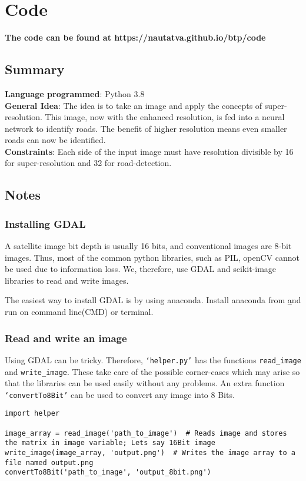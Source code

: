 \chapter{Code}\label{chapt:code}
\textbf{The code can be found at https://nautatva.github.io/btp/code}

\section{Summary}
\textbf{Language programmed}: Python 3.8 \bigskip \\
\textbf{General Idea}: The idea is to take an image and apply the concepts of super-resolution. This image, now with the enhanced resolution, is fed into a neural network to identify roads. The benefit of higher resolution means even smaller roads can now be identified. \bigskip \\
\textbf{Constraints}: Each side of the input image must have resolution divisible by 16 for super-resolution and 32 for road-detection.


\section{Notes}
\subsection{Installing GDAL}
A satellite image bit depth is usually 16 bits, and conventional images are 8-bit images. Thus, most of the common python libraries, such as PIL, openCV cannot be used due to information loss. We, therefore, use GDAL and scikit-image libraries to read and write images.

The easiest way to install GDAL is by using anaconda. Install anaconda from \href{https://www.anaconda.com/products/individual#Downloads} and run  on command line(CMD) or terminal.


\subsection{Read and write an image}
Using GDAL can be tricky. Therefore, \texttt{`helper.py'} has the functions \texttt{read\_image} and \texttt{write\_image}. These take care of the possible corner-cases which may arise so that the libraries can be used easily without any problems. An extra function \texttt{`convertTo8Bit'} can be used to convert any image into 8 Bits.

\begin{verbatim}
import helper

image_array = read_image('path_to_image')  # Reads image and stores the matrix in image variable; Lets say 16Bit image
write_image(image_array, 'output.png')  # Writes the image array to a file named output.png
convertTo8Bit('path_to_image', 'output_8bit.png')
\end{verbatim}


